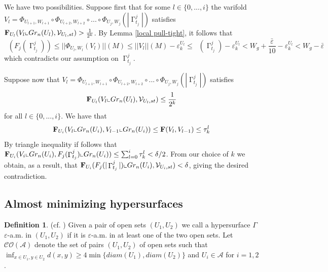 \documentclass[12pt]{amsart}
\newtheorem{proposition}[theorem]{Proposition}
\DeclareMathOperator{\Hn}{\mathcal{H}^n}
\DeclareMathOperator{\G}{\Gamma}
\theoremstyle{definition}
\newtheorem{definition}[theorem]{Definition}
\begin{document}
We have two possibilities. 
Suppose first that for some $l \in \{0,...,i\}$ the varifold
$V_l = \Phi_{U_{l+1}, W_{l+1}} \circ \Phi_{U_{l+2}, W_{l+2}} \circ... \circ \Phi_{U_j,W_j}(|\G_{t_j}^j|)$ satisfies
${\bf F}_{U_{l}}(V_l \llcorner Gr_n(U_{l}), \mathcal{V}_{U_{l},st}) > \frac{1}{2^k}$.
By Lemma \ref*{local pull-tight},
it follows that 
$$\Hn(F_j(\G_{t_j}^j))\leq ||\Phi_{U_{l}, W_l} (V_l)||(M)  \leq ||V_l||(M)  - \varepsilon_k^{U_l} 
\leq \Hn(\G_{t_j}^j)- \varepsilon_k^{U_l}<
W_g + \frac{\bar{\varepsilon}}{10}-\varepsilon_k^{U_l}<W_g - \bar{\varepsilon}$$
which contradicts our assumption on 
$\G_{t_j}^j$.

Suppose now that 
$V_l = \Phi_{U_{l+1}, W_{l+1}} \circ \Phi_{U_{l+2}, W_{l+2}} \circ... \circ \Phi_{U_j,W_j}(|\G_{t_j}^j|)$ satisfies
$${\bf F}_{U_{l}}(V_l \llcorner Gr_n(U_{l}), \mathcal{V}_{U_{l},st}) \leq \frac{1}{2^k}$$
for all $l \in \{0,...,i\}$.
We have that 
$$ {\bf F}_{U_{i}}(V_l \llcorner Gr_n(U_{i}),V_{l-1} \llcorner Gr_n(U_{i})) \leq {\bf F}(V_l,V_{l-1})
\leq \tau^l_k$$
By triangle inequality if follows that
${\bf F}_{U_{i}}(V_i \llcorner Gr_n(U_{i}),
F_j(\G_{t_j}^j) \llcorner Gr_n(U_{i}))
\leq \sum_{l=0} ^i \tau_k^l< \delta/2$.
From our choice of $k$ we obtain, as a result, that
${\bf F}_{U_{i}}(F_j(|\G_{t_j}^j|) \llcorner Gr_n(U_{i}), \mathcal{V}_{U_{i},st})< \delta$,
giving the desired contradiction. 










%


\subsection{Almost minimizing hypersurfaces}

\begin{definition} (cf. \cite[3.2]{DT})
Given a pair of open sets $(U_1, U_2)$ we call a hypersurface 
$\Gamma$ $\varepsilon$-a.m. in $(U_1, U_2)$ if it is $\varepsilon$-a.m. in at least one of the two
open sets. Let $\mathcal{CO}(\mathcal{A})$ denote the set of pairs $(U_1, U_2)$ of open sets such that
$\inf_{x \in U_1, y \in U_2} d(x,y) \geq 4 \min \{diam(U_1), diam(U_2)\}$
and $U_i \in \mathcal{A}$ for $i=1,2$.
\end{definition}
\end{document}
